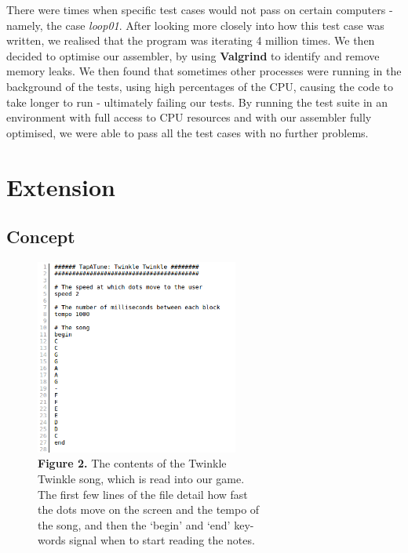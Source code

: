 \documentclass[11pt]{article}
\begin{document}
There were times when specific test cases would not pass on certain computers - namely, the case \emph{loop01}. After looking more closely into how this test case was written, we realised that the program was iterating 4 million times. We then decided to optimise our assembler, by using \textbf{Valgrind} to identify and remove memory leaks. We then found that sometimes other processes were running in the background of the tests, using high percentages of the CPU, causing the code to take longer to run - ultimately failing our tests. By running the test suite in an environment with full access to CPU resources and with our assembler fully optimised, we were able to pass all the test cases with no further problems.

\section{Extension}

\subsection{Concept}

\begin{figure}
  \vspace{-4em}
  \hspace*{1.5em}
  \includegraphics[width=18em]{song}
  \setlength{\belowcaptionskip}{-4em}
  \captionsetup{justification=justified,singlelinecheck=false}
  \caption*{\hspace*{1.4em}\fontsize{9}{9}\selectfont\textbf{Figure 2.} The contents of the Twinkle \\\hspace*{1.6em}Twinkle song, which is read into our game.\\\hspace*{1.6em}The first few lines of the file detail how fast\\\hspace*{1.6em}the dots move on the screen and the tempo of\\\hspace*{1.6em}the song, and then the `begin' and `end' key-\\\hspace*{1.7em}words signal when to start reading the notes. }
\end{figure}
\end{document}
